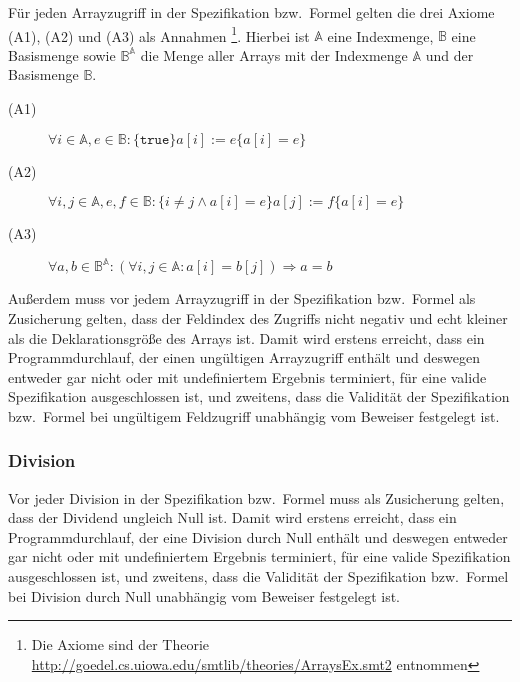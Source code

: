 Für jeden Arrayzugriff in der Spezifikation bzw.\ Formel gelten die
drei Axiome (A1), (A2) und (A3) als Annahmen \footnote{Die Axiome sind
der Theorie
\url{http://goedel.cs.uiowa.edu/smtlib/theories/ArraysEx.smt2}
entnommen}. Hierbei ist $\mathbb{A}$ eine Indexmenge, $\mathbb{B}$
eine Basismenge sowie $\mathbb{B}^\mathbb{A}$ die Menge aller Arrays
mit der Indexmenge $\mathbb{A}$ und der Basismenge $\mathbb{B}$. %

\begin{description}%
    \item[(A1)] \begin{math}\forall i \in \mathbb{A}, e \in \mathbb{B} : \{\texttt{true}\} a[i] := e \{a[i] = e\}\end{math}%
    \item[(A2)] \begin{math}\forall i, j \in \mathbb{A}, e, f \in \mathbb{B} : \{i \neq j \wedge a[i] = e\} a[j] := f \{a[i] = e\}\end{math}%
    \item[(A3)] \begin{math}\forall a, b \in \mathbb{B}^\mathbb{A} : (\forall i, j \in \mathbb{A} : a[i] = b[j]) \Rightarrow a = b\end{math}%
\end{description}%

Außerdem muss vor jedem Arrayzugriff in der Spezifikation bzw.\ Formel
als Zusicherung gelten, dass der Feldindex des Zugriffs nicht negativ
und echt kleiner als die Deklarationsgröße des Arrays ist. Damit wird
erstens erreicht, dass ein Programmdurchlauf, der einen ungültigen
Arrayzugriff enthält und deswegen entweder gar nicht oder mit
undefiniertem Ergebnis terminiert, für eine valide Spezifikation
ausgeschlossen ist, und zweitens, dass die Validität der Spezifikation
bzw.\ Formel bei ungültigem Feldzugriff unabhängig vom Beweiser
festgelegt ist.%

\subsubsection{Division}%

Vor jeder Division in der Spezifikation bzw.\ Formel muss als
Zusicherung gelten, dass der Dividend ungleich Null ist. Damit wird
erstens erreicht, dass ein Programmdurchlauf, der eine Division durch
Null enthält und deswegen entweder gar nicht oder mit undefiniertem
Ergebnis terminiert, für eine valide Spezifikation ausgeschlossen ist,
und zweitens, dass die Validität der Spezifikation bzw.\ Formel bei
Division durch Null unabhängig vom Beweiser festgelegt ist.%

